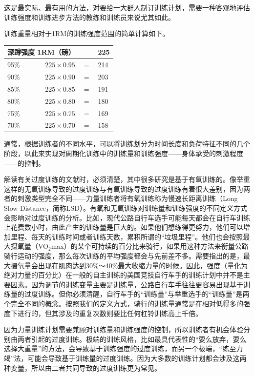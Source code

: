 这是最实际、最有用的方法，对要给一大群人制订训练计划，需要一种客观地评估训练强度和训练进步方法的教练和训练员来说尤其如此。

训练重量相对于1RM的训练强度范围的简单计算如下。

\begin{table}[htbp]
    \centering
    \begin{tabular}{l r c l}
        \hline
        \multicolumn{2}{l}{深蹲强度 1RM（磅）} & & 225 \\
        \hline
        95\% & $225 \times 0.95$ & $=$ & 214 \\
        90\% & $225 \times 0.90$ & $=$ & 203 \\
        85\% & $225 \times 0.85$ & $=$ & 191 \\
        80\% & $225 \times 0.80$ & $=$ & 180 \\
        75\% & $225 \times 0.75$ & $=$ & 169 \\
        70\% & $225 \times 0.70$ & $=$ & 158 \\
        \hline
    \end{tabular}
\end{table}

通常，根据训练者的不同水平，可以将训练划分为时间长度和负荷特征不同的几个阶段，以此来实现对周期化训练中的训练量和训练强度——身体承受的刺激程度——的控制。

解读有关过度训练的文献时，必须清楚，其中很多研究是基于有氧训练的。像举重这样的无氧训练导致的过度训练与有氧训练导致的过度训练有着很大差别，因为两者的刺激类型完全不同——力量训练者将有氧训练称为慢速长距离训练（Long Slow Distance，简称LSD）。有氧和无氧训练对训练量和训练强度的不同定义方式会影响对过度训练的分析。比如，现代公路自行车选手可能每天都会在自行车训练上花费数小时，由此产生的训练量是巨大的。如果他们想练得更努力，他们可以增加里程、每天的训练时间或者训练天数，累积所谓的“垃圾里程”。他们也会按照最大摄氧量（VO$_{2}$max）的某个可持续的百分比来骑行，如果用这种方法来衡量公路骑行运动的强度，那么每次训练的平均强度都会与先前差不多。需要指出的是，最大摄氧量会出现在肌肉达到30\%～40\%最大收缩力量的时候。因此，强度（量化为绝对力量的百分比）在一般的自主训练的美国竞技自行车手的训练计划中并不是主要因素。因为调节的训练变量主要是训练量，公路自行车手往往更容易出现基于训练量的过度训练。但你必须清醒，自行车手的“训练量”与举重选手的“训练量”是两个完全不同的概念。按照我们的定义方式，骑行的训练量通常是在相对低得多的强度下进行的，但其涉及的重复次数则要比任何杠铃训练高上千倍。

因为力量训练计划需要兼顾对训练量和训练强度的控制，所以训练者有机会体验分别由两者引起的过度训练。极端的训练风格，比如最具代表性的“要么放弃，要么选择大重量”的方法，会导致基于训练强度的过度训练，而另一个极端，“练至力竭”法，可能会导致基于训练量的过度训练。因为大多数的训练计划都会涉及这两种变量，所以由二者共同导致的过度训练更为常见。

